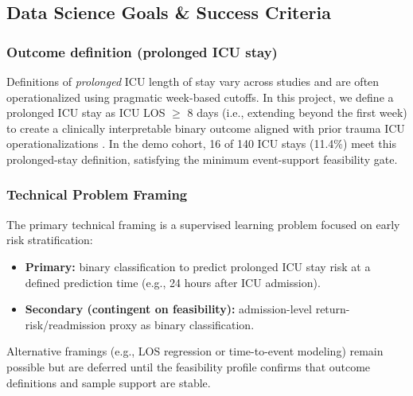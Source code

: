 \documentclass[12pt]{article}
\begin{document}
\subsection{Data Science Goals \& Success Criteria}
\label{subsec:ds_goals}

%
%
\subsubsection*{Outcome definition (prolonged ICU stay)}
Definitions of \emph{prolonged} ICU length of stay vary across studies and are often operationalized using pragmatic week-based cutoffs. In this project, we define a prolonged ICU stay as ICU LOS $\ge$ 8 days (i.e., extending beyond the first week) to create a clinically interpretable binary outcome aligned with prior trauma ICU operationalizations \citep{Lefering2024ProlongedICUStay}. In the demo cohort, 16 of 140 ICU stays (11.4\%) meet this prolonged-stay definition, satisfying the minimum event-support feasibility gate.




\subsubsection*{Technical Problem Framing}
The primary technical framing is a supervised learning problem focused on early risk stratification:
\begin{itemize}[leftmargin=1.5em]
    \item \textbf{Primary:} binary classification to predict prolonged ICU stay risk at a defined prediction time (e.g., 24 hours after ICU admission).
    \item \textbf{Secondary (contingent on feasibility):} admission-level return-risk/readmission proxy as binary classification.
\end{itemize}
Alternative framings (e.g., LOS regression or time-to-event modeling) remain possible but are deferred until the feasibility profile confirms that outcome definitions and sample support are stable.
\end{document}
